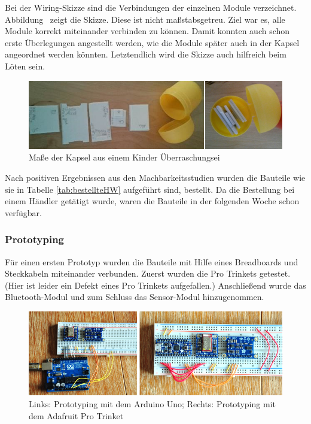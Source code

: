 {Bei der Wiring-Skizze sind die Verbindungen der einzelnen Module verzeichnet. Abbildung \ zeigt die Skizze. Diese ist nicht maßstabsgetreu. Ziel war es, alle Module korrekt miteinander verbinden zu können. Damit konnten auch schon erste Überlegungen angestellt werden, wie die Module später auch in der Kapsel angeordnet werden könnten. Letztendlich wird die Skizze auch hilfreich beim Löten sein.

\begin{figure}[ht]
	\centering
	\includegraphics[width=1\textwidth]{images/k3-machbarkeitsstudie.PNG}
	\caption {Maße der Kapsel aus einem Kinder Überraschungsei}
	\label{fig:k3}
\end{figure}

Nach positiven Ergebnissen aus den Machbarkeitsstudien wurden die Bauteile wie sie in Tabelle \ref{tab:bestellteHW} aufgeführt sind, bestellt. Da die Bestellung bei einem Händler getätigt wurde, waren die Bauteile in der folgenden Woche schon verfügbar.

\subsubsection{Prototyping}

Für einen ersten Prototyp wurden die Bauteile mit Hilfe eines Breadboards und Steckkabeln miteinander verbunden. Zuerst wurden die Pro Trinkets getestet. (Hier ist leider ein Defekt eines Pro Trinkets aufgefallen.) Anschließend wurde das Bluetooth-Modul und zum Schluss das Sensor-Modul hinzugenommen.

\begin{figure}[ht]
	\centering
	\includegraphics[width=1\textwidth]{images/k3-prototyping.PNG}
	\caption {Links: Prototyping mit dem Arduino Uno; Rechts: Prototyping mit dem Adafruit Pro
		Trinket}
	\label{fig:k3_prototyping}
\end{figure}

}
